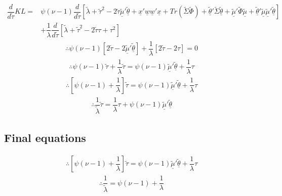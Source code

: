 \documentclass[fleqn]{minimal}
\begin{document}
\begin{align*}
  \dfrac{d}{d\tilde{\tau}}KL
  = &
  \psi\left(\nu-1\right)
  \dfrac{d}{d\tilde{\tau}}
  \left[
    \tilde{\lambda} + \tilde{\tau}^2
    - 2\tilde{\tau}\underline{\tilde{\mu}}'\underline{\tilde{\theta}}
    + \underline{x}'\underline{w}\underline{w}'\underline{x}
    + Tr \left( \tilde{\Sigma}\tilde{\Phi}\right)
    + \underline{\tilde{\theta}}'\tilde{\Sigma}\underline{\tilde{\theta}}
    + \underline{\tilde{\mu}}'\tilde{\Phi}\underline{\tilde{\mu}}
    + \underline{\tilde{\theta}}'\underline{\tilde{\mu}}\underline{\tilde{\mu}}'\underline{\tilde{\theta}}
  \right] \\
  &
  + \dfrac{1}{\lambda}
  \dfrac{d}{d\tilde{\tau}}
  \left[
    \tilde{\lambda} + \tilde{\tau}^2 - 2\tilde{\tau}\tau + \tau^2
  \right]
\end{align*}
\begin{align*}
  \therefore
  \psi\left(\nu-1\right)
  \left[
    2\tilde{\tau}
    - 2\underline{\tilde{\mu}}'\underline{\tilde{\theta}}
  \right]
  + \dfrac{1}{\lambda}
  \left[
    2\tilde{\tau} - 2\tau
  \right]
  =0
\end{align*}
\begin{align*}
  \therefore
  \psi\left(\nu-1\right)
  \tilde{\tau}
  + \dfrac{1}{\lambda}
  \tilde{\tau}
  =
  \psi\left(\nu-1\right)
  \underline{\tilde{\mu}}'\underline{\tilde{\theta}}
  + \dfrac{1}{\lambda}
  \tau
\end{align*}
\begin{align*}
  \therefore
  \left[
    \psi\left(\nu-1\right)
    + \dfrac{1}{\lambda}
  \right]\tilde{\tau}
  =
  \psi\left(\nu-1\right)
  \underline{\tilde{\mu}}'\underline{\tilde{\theta}}
  + \dfrac{1}{\lambda}
  \tau
\end{align*}
\begin{align*}
  \therefore
  \dfrac{1}{\tilde{\lambda}}
  \tilde{\tau}
  =
  \dfrac{1}{\lambda}
  \tau
  +\psi\left(\nu-1\right)
  \underline{\tilde{\mu}}'\underline{\tilde{\theta}}
\end{align*}

\subsection{Final equations}

\begin{align*}
  \therefore
  \left[
    \psi\left(\nu-1\right)
    + \dfrac{1}{\lambda}
  \right]\tilde{\tau}
  =
  \psi\left(\nu-1\right)
  \underline{\tilde{\mu}}'\underline{\tilde{\theta}}
  + \dfrac{1}{\lambda}
  \tau
\end{align*}
\begin{align*}
  \therefore
  \dfrac{1}{\tilde{\lambda}}
  =
  \psi\left(\nu-1\right)
  + \dfrac{1}{\lambda}
\end{align*}
\end{document}
